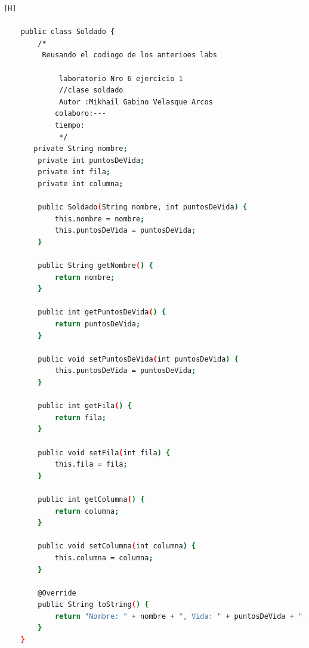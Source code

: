 \documentclass{article}
\begin{document}
	\begin{lstlisting}[language=bash,caption={Creando la clase Soldado}][H]
			
	public class Soldado {
		/*
		 Reusando el codiogo de los anterioes labs
		
			 laboratorio Nro 6 ejercicio 1
			 //clase soldado
			 Autor :Mikhail Gabino Velasque Arcos
			colaboro:---
			tiempo:
			 */
	   private String nombre;
	    private int puntosDeVida;
	    private int fila;
	    private int columna;

	    public Soldado(String nombre, int puntosDeVida) {
	        this.nombre = nombre;
	        this.puntosDeVida = puntosDeVida;
	    }

	    public String getNombre() {
	        return nombre;
	    }

	    public int getPuntosDeVida() {
	        return puntosDeVida;
	    }

	    public void setPuntosDeVida(int puntosDeVida) {
	        this.puntosDeVida = puntosDeVida;
	    }

	    public int getFila() {
	        return fila;
	    }

	    public void setFila(int fila) {
	        this.fila = fila;
	    }

	    public int getColumna() {
	        return columna;
	    }

	    public void setColumna(int columna) {
	        this.columna = columna;
	    }

	    @Override
	    public String toString() {
	        return "Nombre: " + nombre + ", Vida: " + puntosDeVida + ", Fila: " + fila + ", Columna: " + columna;
	    }
	}
	
	\end{lstlisting}	
\end{document}
